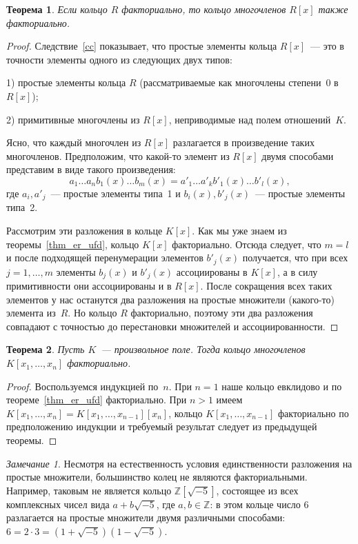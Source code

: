 \documentclass[a4paper,10pt]{amsart}
\def\ZZ{{\mathbb Z}}%
\newtheorem{theorem}{Теорема}
\theoremstyle{definition}
\theoremstyle{remark}
\newtheorem{remark}{Замечание}
\begin{document}
\begin{theorem}
Если кольцо $R$ факториально, то кольцо многочленов $R[x]$ также
факториально.
\end{theorem}

\begin{proof}
Следствие~\ref{cc} показывает, что простые элементы кольца
$R[x]$~--- это в точности элементы одного из следующих двух типов:

1) простые элементы кольца $R$ (рассматриваемые как многочлены
степени~$0$ в $R[x]$);

2) примитивные многочлены из $R[x]$, неприводимые над полем
отношений~$K$.

Ясно, что каждый многочлен из $R[x]$ разлагается в произведение
таких многочленов. Предположим, что какой-то элемент из $R[x]$ двумя
способами представим в виде такого произведения:
$$
a_1 \ldots a_n b_1(x) \ldots b_m(x) = a'_1 \ldots a'_k b'_1(x)
\ldots b'_l(x),
$$
где $a_i, a'_j$~--- простые элементы типа~1 и $b_i(x), b'_j(x)$~---
простые элементы типа~2.

Рассмотрим эти разложения в кольце $K[x]$. Как мы уже знаем из
теоремы~\ref{thm_er_ufd}, кольцо $K[x]$ факториально. Отсюда
следует, что $m = l$ и после подходящей перенумерации элементов
$b'_j(x)$ получается, что при всех $j = 1, \ldots, m$ элементы
$b_j(x)$ и $b'_j(x)$ ассоциированы в $K[x]$, а в силу примитивности
они ассоциированы и в $R[x]$. После сокращения всех таких элементов
у нас останутся два разложения на простые множители (какого-то)
элемента из~$R$. Но кольцо $R$ факториально, поэтому эти два
разложения совпадают с точностью до перестановки множителей и
ассоциированности.
\end{proof}

\begin{theorem}
Пусть $K$~--- произвольное поле. Тогда кольцо многочленов
$K[x_1,\ldots,x_n]$ факториально.
\end{theorem}

\begin{proof}
Воспользуемся индукцией по~$n$. При $n=1$ наше кольцо евклидово и по
теореме~\ref{thm_er_ufd} факториально. При $n > 1$ имеем $K[x_1,
\ldots, x_n] = K[x_1, \ldots, x_{n-1}][x_n]$, кольцо $K[x_1, \ldots,
x_{n-1}]$ факториально по предположению индукции и требуемый
результат следует из предыдущей теоремы.
\end{proof}

\begin{remark}
Несмотря на естественность условия единственности разложения на
простые множители, большинство колец не являются факториальными.
Например, таковым не является кольцо $\ZZ[\sqrt{-5}]$, состоящее из
всех комплексных чисел вида $a + b \sqrt{-5}$, где $a,b \in \ZZ$: в
этом кольце число $6$ разлагается на простые множители двумя
различными способами: $6 = 2 \cdot 3 = (1 + \sqrt{-5})(1 -
\sqrt{-5})$.
\end{remark}
\end{document}
